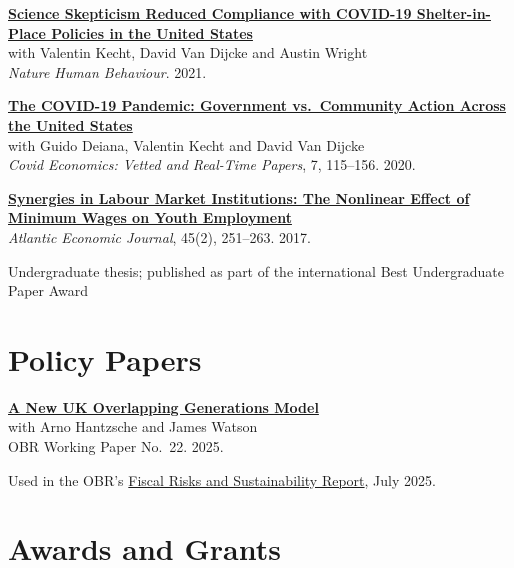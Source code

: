 \documentclass[10pt,a4paper]{article}
\newcommand{\papernote}[1]{\hspace*{1.6em}#1\par}
\newcommand{\papergap}{\par\addvspace{8pt}}
\newenvironment{paperbox}{\par\noindent\begin{minipage}{\textwidth}}{\end{minipage}\par}
\begin{document}
\begin{paperbox}
\textbf{\href{https://www.nature.com/articles/s41562-021-01227-0}{Science Skepticism Reduced Compliance with COVID-19 Shelter-in-Place Policies in the United States}}\\
with Valentin Kecht, David Van Dijcke and Austin Wright\\
\textit{Nature Human Behaviour}. 2021.
\end{paperbox}
\papergap

\begin{paperbox}
\textbf{\href{https://cepr.org/publications/covid-economics-issue-7}{The COVID-19 Pandemic: Government vs.\ Community Action Across the United States}}\\
with Guido Deiana, Valentin Kecht and David Van Dijcke\\
\textit{Covid Economics: Vetted and Real-Time Papers}, 7, 115--156. 2020.
\end{paperbox}
\papergap

\begin{paperbox}
\textbf{\href{https://link.springer.com/article/10.1007/s11293-017-9537-7}{Synergies in Labour Market Institutions: The Nonlinear Effect of Minimum Wages on Youth Employment}}\\
\textit{Atlantic Economic Journal}, 45(2), 251--263. 2017.\par
\papernote{Undergraduate thesis; published as part of the international Best Undergraduate Paper Award}
\end{paperbox}

\section{Policy Papers}

\begin{paperbox}
\textbf{\href{https://obr.uk/docs/dlm_uploads/Working_paper_22_A_new_UK_overlapping_generations_model.pdf}{A New UK Overlapping Generations Model}}\\
with Arno Hantzsche and James Watson\\
OBR Working Paper No.~22. 2025.\par
\papernote{Used in the OBR's \href{https://obr.uk/frs/fiscal-risks-and-sustainability-july-2025/}{Fiscal Risks and Sustainability Report}, July 2025.}
\end{paperbox}

\section{Awards and Grants}
\end{document}
